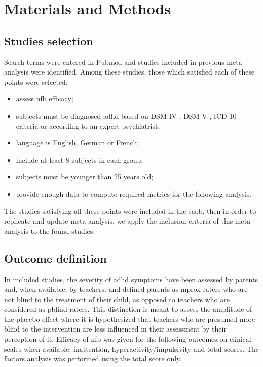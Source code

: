 

\section{Materials and Methods}

\subsection{Studies selection}

Search terms were entered in Pubmed and studies included in previous meta-analysis were identified. Among these studies, those which
satisfied each of these points were selected:
\begin{itemize}
	\item assess \gls{nfb} efficacy; 
	\item subjects must be diagnosed \gls{adhd} based on DSM-IV \citep{DSM-4}, DSM-V \citep{DSM-5}, ICD-10 \citep{ICD101993} 
	criteria or according to an expert psychiatrist; 
	\item language is English, German or French;
	\item include at least 8 subjects in each group;
	\item subjects must be younger than 25 years old;
	\item provide enough data to compute required metrics for the following analysis.
\end{itemize} 
The studies satisfying all these points were included in the \gls{saob}, then in order to replicate and 
update \citeauthor{Cortese2016} meta-analysis, we apply the inclusion criteria of this meta-analysis to the found studies. 

\subsection{Outcome definition} 

In included studies, the severity of \gls{adhd} symptoms have been assessed by parents and, when available, by teachers. \citet{Cortese2016} 
and \citet{Micoulaud2014} defined parents as \gls{mprox} raters who are not blind to the treatment of their child, as opposed to 
teachers who are considered as \gls{pblind} raters. This distinction is meant to assess the amplitude of the placebo effect where 
it is hypothesized that teachers who are presumed more blind to the intervention are less influenced in their assessment by their perception of it. 
Efficacy of \gls{nfb} was given for the following outcomes on clinical scales when available: inattention, 
hyperactivity/impulsivity and total scores. The factors analysis was performed using the total score only.

